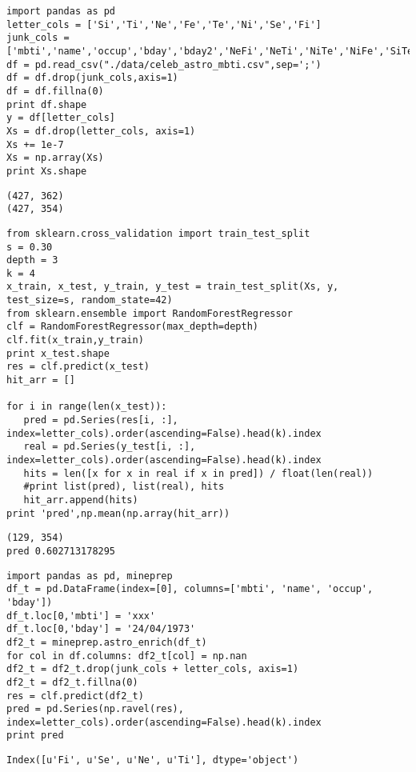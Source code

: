 \documentclass[12pt,fleqn]{article}\usepackage{../common}
\begin{document}
\begin{verbatim}
import pandas as pd
letter_cols = ['Si','Ti','Ne','Fe','Te','Ni','Se','Fi']
junk_cols = ['mbti','name','occup','bday','bday2','NeFi','NeTi','NiTe','NiFe','SiTe','SiFe','SeFi','SeTi']
df = pd.read_csv("./data/celeb_astro_mbti.csv",sep=';')
df = df.drop(junk_cols,axis=1)
df = df.fillna(0)
print df.shape
y = df[letter_cols]
Xs = df.drop(letter_cols, axis=1)
Xs += 1e-7
Xs = np.array(Xs)
print Xs.shape
\end{verbatim}

\begin{verbatim}
(427, 362)
(427, 354)
\end{verbatim}


\begin{verbatim}
from sklearn.cross_validation import train_test_split
s = 0.30
depth = 3
k = 4
x_train, x_test, y_train, y_test = train_test_split(Xs, y, test_size=s, random_state=42)
from sklearn.ensemble import RandomForestRegressor
clf = RandomForestRegressor(max_depth=depth)
clf.fit(x_train,y_train)
print x_test.shape
res = clf.predict(x_test)
hit_arr = []

for i in range(len(x_test)):
   pred = pd.Series(res[i, :], index=letter_cols).order(ascending=False).head(k).index    
   real = pd.Series(y_test[i, :], index=letter_cols).order(ascending=False).head(k).index    
   hits = len([x for x in real if x in pred]) / float(len(real))
   #print list(pred), list(real), hits
   hit_arr.append(hits)
print 'pred',np.mean(np.array(hit_arr))
\end{verbatim}

\begin{verbatim}
(129, 354)
pred 0.602713178295
\end{verbatim}

\begin{verbatim}
import pandas as pd, mineprep
df_t = pd.DataFrame(index=[0], columns=['mbti', 'name', 'occup', 'bday'])
df_t.loc[0,'mbti'] = 'xxx'
df_t.loc[0,'bday'] = '24/04/1973'
df2_t = mineprep.astro_enrich(df_t)
for col in df.columns: df2_t[col] = np.nan
df2_t = df2_t.drop(junk_cols + letter_cols, axis=1)
df2_t = df2_t.fillna(0)
res = clf.predict(df2_t)
pred = pd.Series(np.ravel(res), index=letter_cols).order(ascending=False).head(k).index    
print pred
\end{verbatim}

\begin{verbatim}
Index([u'Fi', u'Se', u'Ne', u'Ti'], dtype='object')
\end{verbatim}
\end{document}
